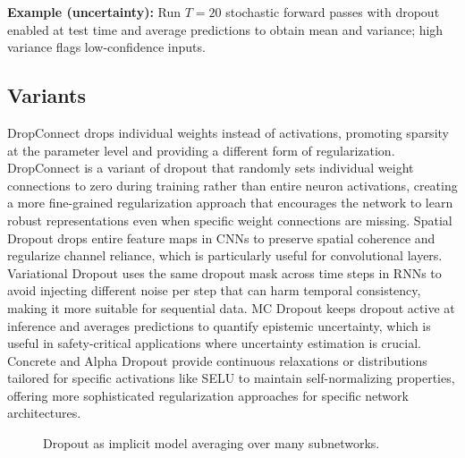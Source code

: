 \begin{example}
\textbf{Example (uncertainty):} Run $T=20$ stochastic forward passes with dropout enabled at test time and average predictions to obtain mean and variance; high variance flags low-confidence inputs.
\end{example}

\subsection{Variants}

DropConnect drops individual weights instead of activations, promoting sparsity at the parameter level and providing a different form of regularization. DropConnect is a variant of dropout that randomly sets individual weight connections to zero during training rather than entire neuron activations, creating a more fine-grained regularization approach that encourages the network to learn robust representations even when specific weight connections are missing. Spatial Dropout drops entire feature maps in CNNs to preserve spatial coherence and regularize channel reliance, which is particularly useful for convolutional layers. Variational Dropout uses the same dropout mask across time steps in RNNs to avoid injecting different noise per step that can harm temporal consistency, making it more suitable for sequential data. MC Dropout keeps dropout active at inference and averages predictions to quantify epistemic uncertainty, which is useful in safety-critical applications where uncertainty estimation is crucial. Concrete and Alpha Dropout provide continuous relaxations or distributions tailored for specific activations like SELU to maintain self-normalizing properties, offering more sophisticated regularization approaches for specific network architectures.

\begin{figure}[htbp]
\centering
{}
\caption{Dropout as implicit model averaging over many subnetworks.}
\label{fig:dropout-ensemble}
\end{figure}

